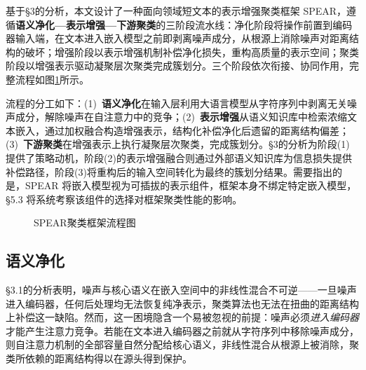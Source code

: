 \documentclass[10.5pt,compsoc,UTF8]{CjC}
\theoremstyle{mystyle}
\begin{document}
基于\S 3的分析，本文设计了一种面向领域短文本的表示增强聚类框架 SPEAR，遵循\textbf{语义净化—表示增强—下游聚类}的三阶段流水线：净化阶段将操作前置到编码器输入端，在文本进入嵌入模型之前即剥离噪声成分，从根源上消除噪声对距离结构的破坏；增强阶段以表示增强机制补偿净化损失，重构高质量的表示空间；聚类阶段以增强表示驱动凝聚层次聚类完成簇划分。三个阶段依次衔接、协同作用，完整流程如图\ref{fig:flow}所示。

流程的分工如下：(1)~\textbf{语义净化}在输入层利用大语言模型从字符序列中剥离无关噪声成分，解除噪声在自注意力中的竞争；(2)~\textbf{表示增强}从语义知识库中检索浓缩文本嵌入，通过加权融合构造增强表示，结构化补偿净化后遗留的距离结构偏差；(3)~\textbf{下游聚类}在增强表示上执行凝聚层次聚类，完成簇划分。\S 3的分析为阶段(1)提供了策略动机，阶段(2)的表示增强融合则通过外部语义知识库为信息损失提供补偿路径，阶段(3)将重构后的输入空间转化为最终的簇划分结果。需要指出的是，SPEAR 将嵌入模型视为可插拔的表示组件，框架本身不绑定特定嵌入模型，\S 5.3 将系统考察该组件的选择对框架聚类性能的影响。

\begin{figure}[H]
  \centering
  \resizebox{\linewidth}{!}{}
  \caption{SPEAR聚类框架流程图}
  \label{fig:flow}
\end{figure}
\vspace{-\intextsep}
\vspace{-2.0ex}
{\heiti \subsection{语义净化}}
\vspace{-1.7ex}

\S 3.1的分析表明，噪声与核心语义在嵌入空间中的非线性混合不可逆——一旦噪声进入编码器，任何后处理均无法恢复纯净表示，聚类算法也无法在扭曲的距离结构上补偿这一缺陷。然而，这一困境隐含一个易被忽视的前提：噪声必须\emph{进入编码器}才能产生注意力竞争。若能在文本进入编码器之前就从字符序列中移除噪声成分，则自注意力机制的全部容量自然分配给核心语义，非线性混合从根源上被消除，聚类所依赖的距离结构得以在源头得到保护。
\end{document}
